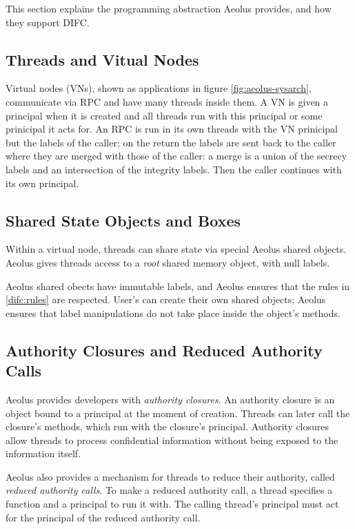 This section explains the programming abstraction Aeolus provides, and how they support DIFC.

\subsection{Threads and Vitual Nodes}

Virtual nodes (VNs), shown as applications in figure \ref{fig:aeolus-sysarch}, communicate via RPC and have many threads inside them. A VN is given a principal when it is created and all threads run with this principal or some prinicipal it acts for. An RPC is run in its own threads with the VN prinicipal but the labels of the caller; on the return the labels are sent back to the caller where they are merged with those of the caller: a merge is a union of the secrecy labels and an intersection of the integrity labels. Then the caller continues with its own principal.

\subsection{Shared State Objects and Boxes}\label{aeolus:shared-mem}

Within a virtual node, threads can share state via special Aeolus shared objects. Aeolus gives threads access to a \emph{root} shared memory object, with null labels.

Aeolus shared obects have immutable labels, and Aeolus ensures that the rules in \ref{difc:rules} are respected. User's can create their own shared objects; Aeolus ensures that label manipulations do not take place inside the object's methods.

\subsection{Authority Closures and Reduced Authority Calls}
\label{aeolus:auth-calls}

Aeolus provides developers with \emph{authority closures}. An authority closure is an object bound to a principal at the moment of creation. Threads can later call the closure's methods, which run with the closure's principal. Authority closures allow threads to process confidential information without being exposed to the information itself.

Aeolus also provides a mechanism for threads to reduce their authority, called \emph{reduced authority calls}. To make a reduced authority call, a thread specifies a function and a principal to run it with. The calling thread's principal must act for the principal of the reduced authority call.

